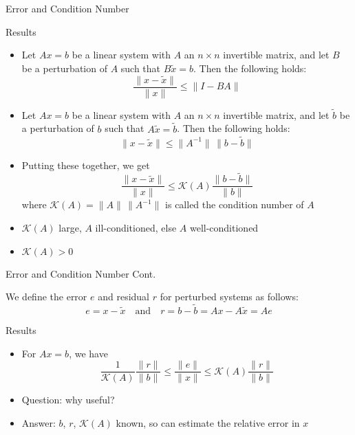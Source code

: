 \documentclass[9pt, serif]{beamer}
\newlength{\wideitemsep}
\let\olditem\item
\renewcommand{\item}{\setlength{\itemsep}{\wideitemsep}\olditem}
\newcommand{\bi}{\begin{itemize}}
\newcommand{\ei}{\end{itemize}}
\newcommand{\norm}[1]{\lVert#1\rVert}
\begin{document}
\begin{frame}{Error and Condition Number}
    \pause
    \begin{block}{Results}
        \bi
            \item Let $Ax = b$ be a linear system with $A$ an $n \times n$ invertible matrix, and let $B$ be a perturbation of
            $A$ such that $B\tilde{x} = b$. Then the following holds: $$\frac{\norm{x-\tilde{x}}}{\norm{x}} \le \norm{I-BA}$$ \pause
            \vspace{-5mm}
            \item Let $Ax = b$ be a linear system with $A$ an $n \times n$ invertible matrix, and let $\tilde{b}$ be a perturbation of
            $b$ such that $A\tilde{x} = \tilde{b}$. Then the following holds: $$\norm{x-\tilde{x}} \le \norm{A^{-1}}\,\norm{b-\tilde{b}}$$ \pause
            \vspace{-5mm}
            \item Putting these together, we get 
            $$\frac{\norm{x-\tilde{x}}}{\norm{x}} \le \mathcal{K}(A)\frac{\norm{b-\tilde{b}}}{\norm{b}}$$ where 
            $\mathcal{K}(A) = \norm{A}\,\norm{A^{-1}}$ is called the condition number of $A$ \pause
            \item $\mathcal{K}(A)$ large, $A$ ill-conditioned, else $A$ well-conditioned \pause
            \item $\mathcal{K}(A)>0$
        \ei
    \end{block}
\end{frame}


\begin{frame}{Error and Condition Number Cont.}
    \pause
    \begin{definition}
        We define the error $e$ and residual $r$ for perturbed systems as follows: 
        $$e = x - \tilde{x} \quad \text{and} \quad r = b - \tilde{b} = Ax - A\tilde{x} = Ae$$
    \end{definition} \pause
    \begin{block}{Results}
        \bi
            \item For $Ax = b$, we have 
            $$\frac{1}{\mathcal{K}(A)}\frac{\norm{r}}{\norm{b}} \le \frac{\norm{e}}{\norm{x}} \le \mathcal{K}(A)\frac{\norm{r}}{\norm{b}}$$
            \pause
            \item Question: why useful? \pause
            \item Answer: $b$, $r$, $\mathcal{K}(A)$ known, so can estimate the relative error in $x$
        \ei
    \end{block}
\end{frame}
\end{document}
